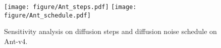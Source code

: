     \begin{figure}[ht]
        \centering
        \texttt{[image: figure/Ant\_steps.pdf]}
        \texttt{[image: figure/Ant\_schedule.pdf]}\\
        \caption{Sensitivity analysis on diffusion steps and diffusion noise schedule on Ant-v4.}
        \label{fig:ablation-study}
    \end{figure}
